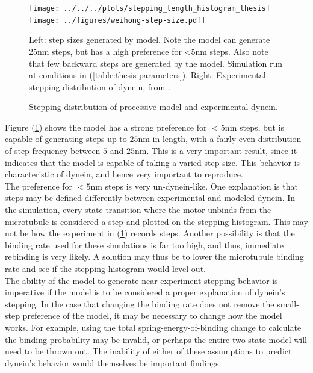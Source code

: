 \documentclass[
11pt, %
english, %
singlespacing, %
headsepline, %
chapterinoneline, %
]{MastersDoctoralThesis} %
\begin{document}
\begin{figure}[H]
  \centering
    \texttt{[image: ../../../plots/stepping\_length\_histogram\_thesis]}%
    \texttt{[image: ../figures/weihong-step-size.pdf]}
    \caption{Stepping distribution of processive model and experimental dynein.}{Left: step sizes generated by model. Note the model can generate 25nm steps, but has a high preference for <5nm steps. Also note that few backward steps are generated by the model. Simulation run at conditions in (\ref{table:thesis-parameters}). Right: Experimental stepping distribution of dynein, from \cite{weihongpaper}.}
    \label{fig:final-histograms}
\end{figure}

Figure (\ref{fig:final-histograms}) shows the model has a strong preference for $<5$nm steps, but is capable of generating steps up to $25$nm in length, with a fairly even distribution of step frequency between $5$ and $25$nm. This is a very important result, since it indicates that the model is capable of taking a varied step size. This behavior is characteristic of dynein, and hence very important to reproduce.\\

The preference for $<5$nm steps is very un-dynein-like. One explanation is that steps may be defined differently between experimental and modeled dynein. In the simulation, every state transition where the motor unbinds from the microtubule is considered a step and plotted on the stepping histogram. This may not be how the experiment in (\ref{fig:final-histograms}) records steps. Another possibility is that the binding rate used for these simulations is far too high, and thus, immediate rebinding is very likely. A solution may thus be to lower the microtubule binding rate and see if the stepping histogram would level out.\\

The ability of the model to generate near-experiment stepping behavior is imperative if the model is to be considered a proper explanation of dynein's stepping. In the case that changing the binding rate does not remove the small-step preference of the model, it may be necessary to change how the model works. For example, using the total spring-energy-of-binding change to calculate the binding probability may be invalid, or perhaps the entire two-state model will need to be thrown out. The inability of either of these assumptions to predict dynein's behavior would themselves be important findings.\\
\end{document}
